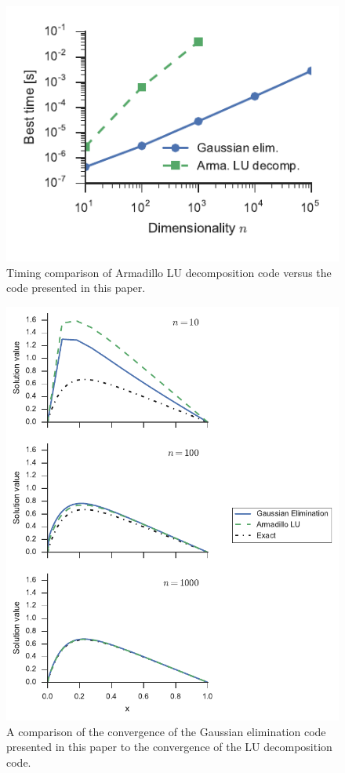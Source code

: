 \documentclass{article}
\begin{document}
            \begin{figure}[p]
                \centering
                \includegraphics{times.pdf}
                \caption{Timing comparison of Armadillo LU decomposition code versus the code presented in this paper.}
                \label{fig:timing}
            \end{figure}

            \begin{figure}[p]
                \centering
                \includegraphics{conv_vs_arma.pdf}
                \caption{A comparison of the convergence of the Gaussian elimination code presented in this paper to the convergence of the LU decomposition code.}
                \label{fig:convcomp}
            \end{figure}
\end{document}
